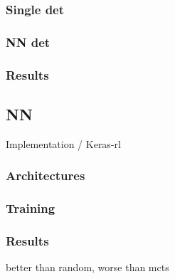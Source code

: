 \subsubsection{Single det}


\subsubsection{NN det}


\subsubsection{Results}


\subsection{NN}
Implementation / Keras-rl


\subsubsection{Architectures}


\subsubsection{Training}


\subsubsection{Results}
better than random, worse than mcts
